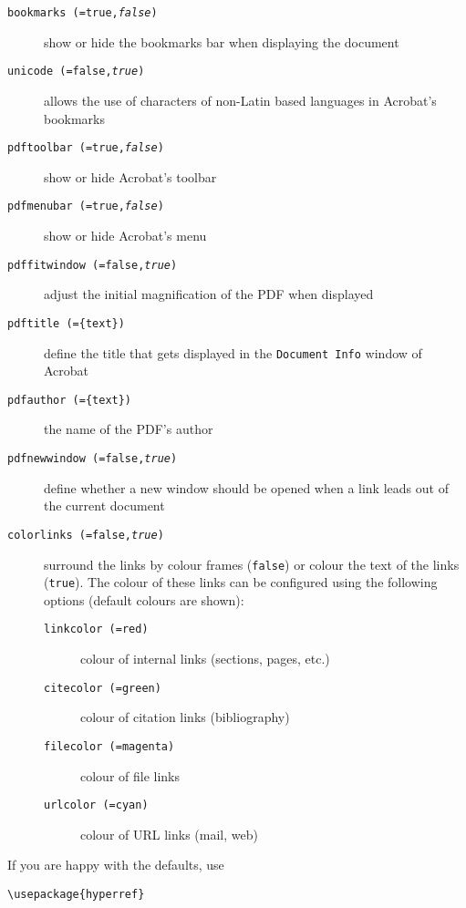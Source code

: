 \begin{flushleft}
\begin{description}
  \item [\texttt{bookmarks (=true,\textit{false})}] show or hide the
    bookmarks bar when displaying the document
  \item [\texttt{unicode (=false,\textit{true})}] allows the use of
    characters of non-Latin based languages in Acrobat's bookmarks
  \item [\texttt{pdftoolbar (=true,\textit{false})}] show or hide
    Acrobat's toolbar
  \item [\texttt{pdfmenubar (=true,\textit{false})}] show or hide
    Acrobat's menu
  \item [\texttt{pdffitwindow (=false,\textit{true})}] adjust the
    initial magnification of the PDF when displayed
  \item [\texttt{pdftitle (=\{text\})}] define the title that gets
    displayed in the \texttt{Document Info} window of Acrobat
  \item [\texttt{pdfauthor (=\{text\})}] the name of the PDF's author
  \item [\texttt{pdfnewwindow (=false,\textit{true})}] define whether a new
    window should be opened when a link leads out of the current
    document
  \item [\texttt{colorlinks (=false,\textit{true})}] surround the
    links by colour frames (\texttt{false}) or colour the text of the links
    (\texttt{true}). The colour of these links can be configured
    using the following options (default colours are shown):
    \begin{description}
    \item [\texttt{linkcolor (=red)}] colour of internal
      links (sections, pages, etc.)
    \item [\texttt{citecolor (=green)}] colour of
      citation links (bibliography)
    \item [\texttt{filecolor (=magenta)}] colour of file
      links
    \item [\texttt{urlcolor (=cyan)}] colour of URL
      links (mail, web)
    \end{description}
\end{description}
\end{flushleft}

If you are happy with the defaults, use
\begin{code}
\begin{verbatim}
\usepackage{hyperref}
\end{verbatim}
\end{code}

